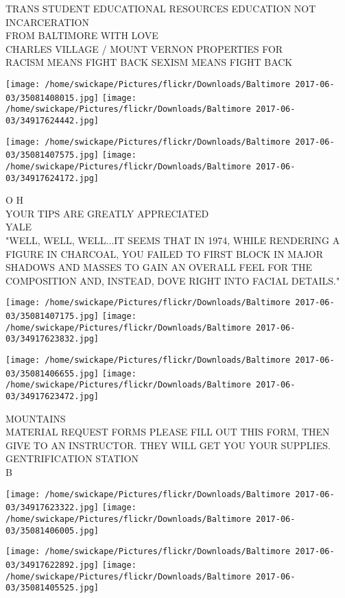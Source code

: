 \documentclass[10pt,letterpaper]{article}
\begin{document}
TRANS STUDENT EDUCATIONAL RESOURCES EDUCATION NOT INCARCERATION\\
FROM BALTIMORE WITH LOVE\\
CHARLES VILLAGE / MOUNT VERNON PROPERTIES FOR\\
RACISM MEANS FIGHT BACK SEXISM MEANS FIGHT BACK\\
\pagebreak

\texttt{[image: /home/swickape/Pictures/flickr/Downloads/Baltimore 2017-06-03/35081408015.jpg]}
\texttt{[image: /home/swickape/Pictures/flickr/Downloads/Baltimore 2017-06-03/34917624442.jpg]}

\texttt{[image: /home/swickape/Pictures/flickr/Downloads/Baltimore 2017-06-03/35081407575.jpg]}
\texttt{[image: /home/swickape/Pictures/flickr/Downloads/Baltimore 2017-06-03/34917624172.jpg]}

O H\\
YOUR TIPS ARE GREATLY APPRECIATED\\
YALE\\
"WELL, WELL, WELL...IT SEEMS THAT IN 1974, WHILE RENDERING A FIGURE IN CHARCOAL, YOU FAILED TO FIRST BLOCK IN MAJOR SHADOWS AND MASSES TO GAIN AN OVERALL FEEL FOR THE COMPOSITION AND, INSTEAD, DOVE RIGHT INTO FACIAL DETAILS."\\
\pagebreak

\texttt{[image: /home/swickape/Pictures/flickr/Downloads/Baltimore 2017-06-03/35081407175.jpg]}
\texttt{[image: /home/swickape/Pictures/flickr/Downloads/Baltimore 2017-06-03/34917623832.jpg]}

\texttt{[image: /home/swickape/Pictures/flickr/Downloads/Baltimore 2017-06-03/35081406655.jpg]}
\texttt{[image: /home/swickape/Pictures/flickr/Downloads/Baltimore 2017-06-03/34917623472.jpg]}

MOUNTAINS\\
MATERIAL REQUEST FORMS PLEASE FILL OUT THIS FORM, THEN GIVE TO AN INSTRUCTOR.  THEY WILL GET YOU YOUR SUPPLIES.\\
GENTRIFICATION STATION\\
B\\
\pagebreak

\texttt{[image: /home/swickape/Pictures/flickr/Downloads/Baltimore 2017-06-03/34917623322.jpg]}
\texttt{[image: /home/swickape/Pictures/flickr/Downloads/Baltimore 2017-06-03/35081406005.jpg]}

\texttt{[image: /home/swickape/Pictures/flickr/Downloads/Baltimore 2017-06-03/34917622892.jpg]}
\texttt{[image: /home/swickape/Pictures/flickr/Downloads/Baltimore 2017-06-03/35081405525.jpg]}
\end{document}
